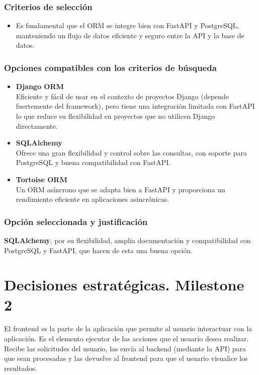 \subsubsection{Criterios de selección}
\begin{itemize}
    \item Es fundamental que el ORM se integre bien con FastAPI y PostgreSQL, manteniendo un flujo de datos eficiente y seguro entre la API y la base de datos.
\end{itemize}

\subsubsection{Opciones compatibles con los criterios de búsqueda}
\begin{itemize}
    \item \textbf{Django ORM}\\
        Eficiente y fácil de usar en el contexto de proyectos Django (depende fuertemente del framework), pero tiene una integración limitada con FastAPI lo que reduce su flexibilidad en proyectos que no utilicen Django directamente.
    \item \textbf{SQLAlchemy}\\
        Ofrece una gran flexibilidad y control sobre las consultas, con soporte para PostgreSQL y buena compatibilidad con FastAPI.
    \item \textbf{Tortoise ORM}\\
        Un ORM asíncrono que se adapta bien a FastAPI y proporciona un rendimiento eficiente en aplicaciones asincrónicas.
\end{itemize}

\subsubsection{Opción seleccionada y justificación}
\textbf{SQLAlchemy}, por su flexibilidad, amplia documentación y compatibilidad con PostgreSQL y FastAPI, que hacen de esta una buena opción\cite{myers2015essential}.


\section{Decisiones estratégicas. Milestone 2}
El frontend es la parte de la aplicación que permite al usuario interactuar con la aplicación. Es el elemento ejecutor de las acciones que el usuario desea realizar. Recibe las solicitudes del usuario, las envía al backend (mediante la API) para que sean procesadas y las devuelve al frontend para que el usuario visualice los resultados.

